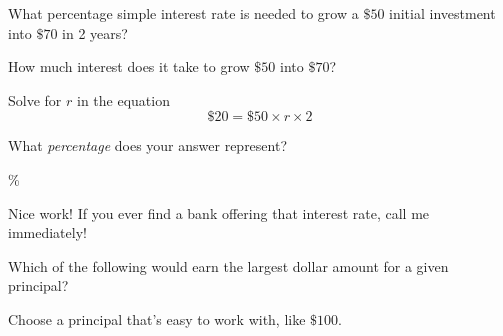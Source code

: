 \documentclass{ximera}
\begin{document}
\begin{question}
What percentage simple interest rate is needed to grow a $\$50$ initial investment into $\$70$ in 2 years?

\begin{solution}
\begin{hint}
How much interest does it take to grow $\$50$ into $\$70$?
\end{hint}
\begin{hint}
Solve for $r$ in the equation
\begin{equation*}\$20=\$50\times r\times 2\end{equation*}
\end{hint}
\begin{hint}
What \emph{percentage} does your answer represent?
\end{hint}
\%

\begin{comment}
\begin{expression-answer}
function validator(p) {
    if (p == 20)
      return 1;
    if (p == 0.2) {feedback( `What percentage does this value represent?')
    }
    if (p == 2) {feedback( `How would you represent $2\%$ as a decimal? Does this match your answer?')
    }
      return 0;
  }
\end{expression-answer}
\end{comment}
\end{solution}	

Nice work! If you ever find a bank offering that interest rate, call me immediately!
\end{question}

\begin{question}
Which of the following would earn the largest dollar amount for a given principal?
  \begin{solution}
    \begin{multiple-choice}
    \end{multiple-choice}
    \begin{hint}
    Choose a principal that's easy to work with, like $\$100$.
    \end{hint}
  \end{solution}
\end{question}
\end{document}
